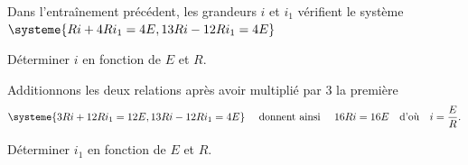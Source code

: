 
\finEntrainement







\titreEntrainementFacultatif	{}
\hauteurLargeurCadreReponse		{9mm}{35mm}
\initialisationEntrainement

Dans l'entraînement précédent, les grandeurs $i$ et $i_1$ vérifient le système $\systeme{Ri+4Ri_1=4E,13Ri-12Ri_1=4E}$

\smallskip

\debutEntrainement


\begin{enonce}
Déterminer $i$ en fonction de $E$  et $R$.
\end{enonce}


\begin{corrige}
	Additionnons les deux relations après avoir multiplié par 3 la première
	\[
	\systeme{3Ri+12Ri_1=12E,13Ri-12Ri_1=4E}
	\quad\text{ donnent ainsi }\quad
	16 Ri=16E	
	\quad\text{d'où}\quad
	i=\frac{E}{R}.
	\]
\end{corrige}


\begin{enonce}
	Déterminer $i_1$ en fonction de $E$ et $R$.	
\end{enonce}

